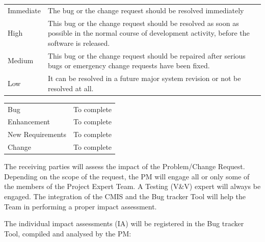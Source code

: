 \documentclass{template/openetcs_article}
\begin{document}
\begin{flushleft}
\begin{tabular}{|m{3cm}|m{11cm}|}
\hline
\rowcolor{myblue}
\multicolumn{2}{|c|}{Priority}\\\hline
Immediate &
The bug or the change request should be resolved immediately\\\hline
High &
This bug or the change request should be resolved as soon as possible in the normal course of development activity, before the software is released. \\\hline
Medium &
This bug or the change request should be repaired after serious bugs or emergency change requests have been fixed. \\\hline
Low &
It can be resolved in a future major system revision or not be resolved at all.\\\hline
\end{tabular}
\end{flushleft}


\begin{flushleft}
\begin{tabular}{|m{3cm}|m{11cm}|}
\hline
\rowcolor{myblue}
\multicolumn{2}{|c|}{Classification}\\\hline
Bug &
To complete\\\hline
Enhancement &
To complete\\\hline
New Requirements &
To complete\\\hline
Change &
To complete\\\hline
\end{tabular}
\end{flushleft}

The receiving parties will assess the impact of the Problem/Change Request. Depending on the scope of the request, the PM will engage all or only some of the members of the Project Expert Team. A Testing (V\&V) expert will always be engaged. The integration of the CMIS and the Bug tracker Tool will help the Team in performing a proper impact assessment. 


The individual impact assessments (IA) will be registered in the Bug tracker Tool, compiled and analysed by the PM:
\end{document}
